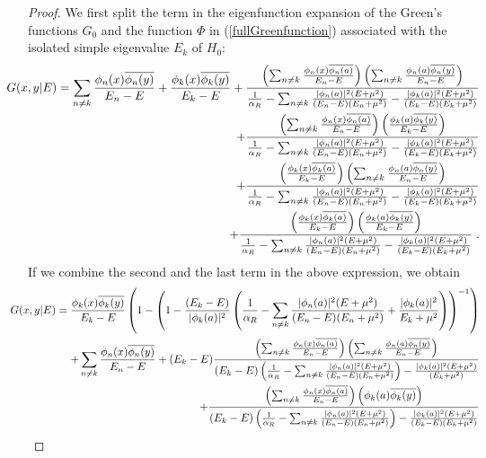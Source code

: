 \documentclass[amsmath,amssymb,14pt]{article}
\numberwithin{equation}{section}
\begin{document}
\begin{proof}
We first split the term in the eigenfunction expansion of the Green's functions $G_0$ and the function $\Phi$ in (\ref{fullGreenfunction}) associated with the isolated simple eigenvalue $E_k$ of $H_0$:
%
\begin{eqnarray} & & \hskip-1cm
    G(x,y|E)= \sum_{n \neq k} \frac{\phi_n(x) \overline{\phi_n(y)}}{E_n-E} + \frac{\phi_k(x) \overline{\phi_k(y)}}{E_k-E} + \frac{ \left(\sum_{n \neq k} \frac{\phi_n(x) \overline{\phi_n(a)}}{E_n-E} \right) \left( \sum_{n \neq k} \frac{\phi_n(a) \overline{\phi_n(y)}}{E_n-E}\right)}{\frac{1}{\alpha_R}-\sum_{n \neq k} \frac{|\phi_n(a)|^2(E+\mu^2)}{(E_n-E)(E_n+\mu^2)} - \frac{|\phi_k(a)|^2(E+\mu^2)}{(E_k-E)(E_k+\mu^2)}}  \nonumber \\ & & \hspace{1cm}+  \frac{\left(\sum_{n \neq k} \frac{\phi_n(x) \overline{\phi_n(a)}}{E_n-E} \right) \left(\frac{\phi_k(a) \overline{\phi_k(y)}}{E_k-E}\right)}{\frac{1}{\alpha_R}-\sum_{n \neq k} \frac{|\phi_n(a)|^2(E+\mu^2)}{(E_n-E)(E_n+\mu^2)} - \frac{|\phi_k(a)|^2(E+\mu^2)}{(E_k-E)(E_k+\mu^2)}} 
    \nonumber \\ & & \hspace{2cm} + \frac{ \left(\frac{\phi_k(x) \overline{\phi_k(a)}}{E_k-E} \right) \left( \sum_{n \neq k} \frac{\phi_n(a) \overline{\phi_n(y)}}{E_n-E}\right)}{\frac{1}{\alpha_R}-\sum_{n \neq k} \frac{|\phi_n(a)|^2(E+\mu^2)}{(E_n-E)(E_n+\mu^2)} - \frac{|\phi_k(a)|^2(E+\mu^2)}{(E_k-E)(E_k+\mu^2)}} \nonumber \\ & & \hspace{3cm} + \frac{ \left(\frac{\phi_k(x) \overline{\phi_k(a)}}{E_k-E} \right) \left( \frac{\phi_k(a) \overline{\phi_k(y)}}{E_k-E}\right)}{\frac{1}{\alpha_R}-\sum_{n \neq k} \frac{|\phi_n(a)|^2(E+\mu^2)}{(E_n-E)(E_n+\mu^2)} - \frac{|\phi_k(a)|^2(E+\mu^2)}{(E_k-E)(E_k+\mu^2)}} \;.
\end{eqnarray}
%
If we combine the second and the last term in the above expression, we obtain
%
\begin{eqnarray} & & \hskip-1cm
    G(x,y|E)= \frac{\phi_k(x) \overline{\phi_k(y)}}{E_k-E}  \left(1- \left(1- \frac{(E_k-E)}{|\phi_k(a)|^2} \left(\frac{1}{\alpha_R}-\sum_{n \neq k} \frac{|\phi_n(a)|^2 (E+\mu^2)}{(E_n-E)(E_n +\mu^2)} + \frac{|\phi_k(a)|^2}{E_k+\mu^2}\right)\right)^{-1}\right) \nonumber \\ & & \hspace{1cm} + \sum_{n \neq k} \frac{\phi_n(x) \overline{\phi_n(y)}}{E_n-E} + (E_k-E) \frac{ \left(\sum_{n \neq k} \frac{\phi_n(x) \overline{\phi_n(a)}}{E_n-E} \right) \left( \sum_{n \neq k} \frac{\phi_n(a) \overline{\phi_n(y)}}{E_n-E}\right)}{(E_k-E) \left(\frac{1}{\alpha_R}-\sum_{n \neq k} \frac{|\phi_n(a)|^2(E+\mu^2)}{(E_n-E)(E_n+\mu^2)}\right) - \frac{|\phi_k(a)|^2(E+\mu^2)}{(E_k+\mu^2)}}  \nonumber \\ & & \hspace{2cm} +  \frac{\left(\sum_{n \neq k} \frac{\phi_n(x) \overline{\phi_n(a)}}{E_n-E} \right) \left(\phi_k(a) \overline{\phi_k(y)}\right)}{(E_k-E)\left(\frac{1}{\alpha_R}-\sum_{n \neq k} \frac{|\phi_n(a)|^2(E+\mu^2)}{(E_n-E)(E_n+\mu^2)}\right) - \frac{|\phi_k(a)|^2(E+\mu^2)}{(E_k-E)(E_k+\mu^2)}} 

\end{eqnarray}
\end{proof}
\end{document}
